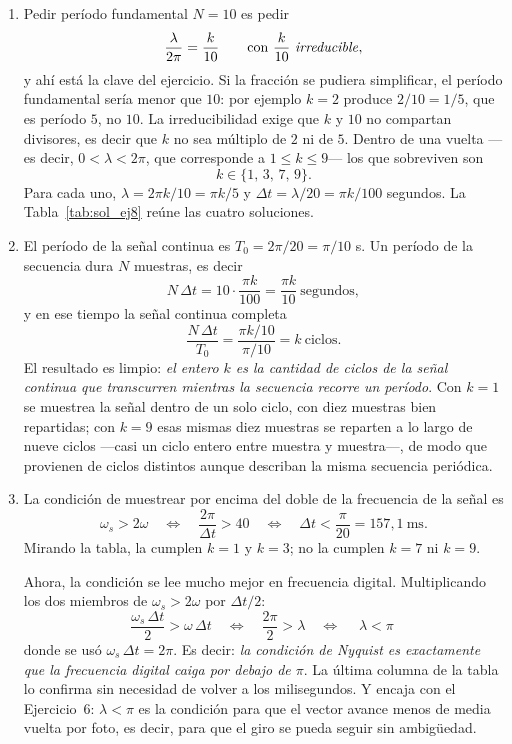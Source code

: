 \documentclass[10pt,a4paper]{article}
\begin{document}
	\begin{enumerate}
		\item Pedir período fundamental $N=10$ es pedir
		\[
			\frac{\lambda}{2\pi}=\frac{k}{10}
			\qquad\text{con } \frac{k}{10} \text{ \emph{irreducible}},
		\]
		y ahí está la clave del ejercicio. Si la fracción se pudiera simplificar, el período
		fundamental sería menor que $10$: por ejemplo $k=2$ produce $2/10=1/5$, que es período
		$5$, no $10$. La irreducibilidad exige que $k$ y $10$ no compartan divisores, es decir
		que $k$ no sea múltiplo de $2$ ni de $5$. Dentro de una vuelta ---es decir,
		$0<\lambda<2\pi$, que corresponde a $1\leq k\leq 9$--- los que sobreviven son
		\[
			k \in \{1,\,3,\,7,\,9\}.
		\]
		Para cada uno, $\lambda = 2\pi k/10 = \pi k/5$ y $\Delta t = \lambda/20 = \pi k/100$
		segundos. La Tabla~\ref{tab:sol_ej8} reúne las cuatro soluciones.

		\item El período de la señal
		continua es $T_0 = 2\pi/20 = \pi/10$ s. Un período de la secuencia dura $N$ muestras,
		es decir
		\[
			N\,\Delta t = 10\cdot\frac{\pi k}{100} = \frac{\pi k}{10}\ \text{segundos},
		\]
		y en ese tiempo la señal continua completa
		\[
			\frac{N\,\Delta t}{T_0} = \frac{\pi k/10}{\pi/10} = k \ \text{ciclos}.
		\]
		El resultado es limpio: \emph{el entero $k$ es la cantidad de ciclos de la señal
		continua que transcurren mientras la secuencia recorre un período}. Con $k=1$ se
		muestrea la señal dentro de un solo ciclo, con diez muestras bien repartidas; con
		$k=9$ esas mismas diez muestras se reparten a lo largo de nueve ciclos ---casi un ciclo
		entero entre muestra y muestra---, de modo que provienen de ciclos distintos aunque
		describan la misma secuencia periódica.

		\item La condición de muestrear por encima del doble de
		la frecuencia de la señal es
		\[
			\omega_s > 2\omega
			\quad\Longleftrightarrow\quad
			\frac{2\pi}{\Delta t} > 40
			\quad\Longleftrightarrow\quad
			\Delta t < \frac{\pi}{20} = 157{,}1\ \text{ms}.
		\]
		Mirando la tabla, la cumplen $k=1$ y $k=3$; no la cumplen $k=7$ ni $k=9$.

		Ahora, la condición se lee mucho mejor en frecuencia digital. Multiplicando los dos
		miembros de $\omega_s>2\omega$ por $\Delta t/2$:
		\[
			\frac{\omega_s\,\Delta t}{2} > \omega\,\Delta t
			\quad\Longleftrightarrow\quad
			\frac{2\pi}{2} > \lambda
			\quad\Longleftrightarrow\quad
			\boxed{\;\lambda < \pi\;}
		\]
		donde se usó $\omega_s\,\Delta t = 2\pi$. Es decir: \emph{la condición de Nyquist es
		exactamente que la frecuencia digital caiga por debajo de $\pi$}. La última columna de
		la tabla lo confirma sin necesidad de volver a los milisegundos. Y encaja con el
		Ejercicio~6: $\lambda<\pi$ es la condición para que el vector avance menos de media
		vuelta por foto, es decir, para que el giro se pueda seguir sin ambigüedad.
	\end{enumerate}
\end{document}
